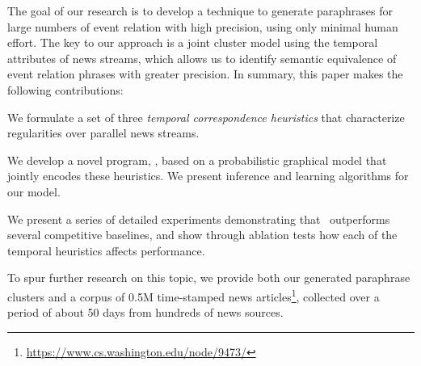 The goal of our research is to develop a technique to generate paraphrases for
large numbers of event relation with high precision, using only
minimal human effort. The key to our approach is a joint cluster model
using the temporal attributes of news streams, which allows us to
identify semantic equivalence of event relation phrases with greater
precision. In summary, this paper makes the following contributions:

\bi
\item We formulate a set of three {\em temporal correspondence heuristics}
that characterize regularities over parallel news streams.

\item We develop a novel program, \sys, based on a probabilistic
  graphical model that jointly encodes these heuristics. We present
  inference and learning algorithms for our model.
\item We present a series of detailed experiments demonstrating that
  \sys\ outperforms several competitive baselines, and show through
  ablation tests how each of the temporal heuristics affects
  performance.
\item To spur further research on this topic, we provide both our
  generated paraphrase clusters and a corpus of 0.5M time-stamped news
  articles\footnote{\url{https://www.cs.washington.edu/node/9473/}},
  collected over a period of about 50 days from hundreds of news sources.
\ei





